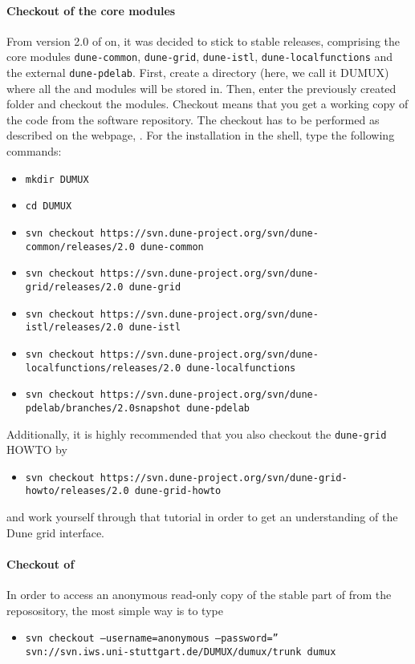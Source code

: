 \paragraph{Checkout of the core modules}
From version 2.0 of \Dune on, it was decided to stick to stable \Dune releases, comprising the core modules 
\texttt{dune-common}, \texttt{dune-grid}, \texttt{dune-istl}, \texttt{dune-localfunctions} and the external \texttt{dune-pdelab}.  
First, create a directory (here, we call it DUMUX) where all the \Dune and \Dumux modules will be stored in. Then, enter the previously created folder and checkout the modules. Checkout means that you get a working copy of the code from the software repository. 
The checkout has to be performed as described on the \Dune webpage, \cite{DUNE-HP}. For the installation in the shell, type the following commands:
\begin{itemize}
\item \texttt{mkdir DUMUX}
\item \texttt{cd DUMUX}
\item \texttt{svn checkout https://svn.dune-project.org/svn/dune-common/releases/2.0 dune-common}
\item \texttt{svn checkout https://svn.dune-project.org/svn/dune-grid/releases/2.0 dune-grid}
\item \texttt{svn checkout https://svn.dune-project.org/svn/dune-istl/releases/2.0 dune-istl}
\item \texttt{svn checkout https://svn.dune-project.org/svn/dune-localfunctions/releases/2.0 dune-localfunctions}
\item \texttt{svn checkout https://svn.dune-project.org/svn/dune-pdelab/branches/2.0snapshot dune-pdelab}
\end{itemize} 

Additionally, it is highly recommended that you also checkout the \texttt{dune-grid} HOWTO by 
\begin{itemize}
\item \texttt{svn checkout https://svn.dune-project.org/svn/dune-grid-howto/releases/2.0 dune-grid-howto}
\end{itemize}
and work yourself through that tutorial in order to get an understanding of the Dune grid interface. 

\paragraph{Checkout of \Dumux}

In order to access an anonymous read-only copy of the stable part of \Dumux from the reposository, the most simple way is to type
\begin{itemize}
\item \texttt{svn checkout --username=anonymous --password='' \\ 
svn://svn.iws.uni-stuttgart.de/DUMUX/dumux/trunk dumux}
\end{itemize}

